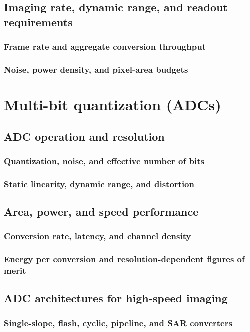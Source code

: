 \documentclass[PhD, UKenglish]{scrbook}
\begin{document}
\subsection{Imaging rate, dynamic range, and readout requirements}
\subsubsection{Frame rate and aggregate conversion throughput}
\subsubsection{Noise, power density, and pixel-area budgets}

\clearpage

\section{Multi-bit quantization (ADCs)}
\subsection{ADC operation and resolution}
\subsubsection{Quantization, noise, and effective number of bits}
\subsubsection{Static linearity, dynamic range, and distortion}
\subsection{Area, power, and speed performance}
\subsubsection{Conversion rate, latency, and channel density}
\subsubsection{Energy per conversion and resolution-dependent figures of merit}
\subsection{ADC architectures for high-speed imaging}
\subsubsection{Single-slope, flash, cyclic, pipeline, and SAR converters}
\end{document}
